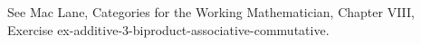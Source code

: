 See Mac Lane, Categories for the Working Mathematician, Chapter VIII, Exercise ex-additive-3-biproduct-associative-commutative.
